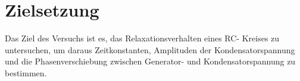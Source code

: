 \section{Zielsetzung}
Das Ziel des Versuchs ist es, das Relaxationsverhalten eines RC- Kreises
zu untersuchen, um daraus Zeitkonstanten, Amplituden der Kondensatorspannung und
die Phasenverschiebung zwischen Generator- und Kondensatorspannung zu bestimmen.